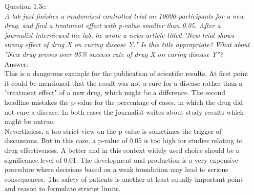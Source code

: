 
Question 1.3c:\\	
\textsl{A lab just finishes a randomized controlled trial on 10000 participants for a new drug, and find a treatment effect with p-value smaller than 0.05. After a journalist interviewed the lab, he wrote a news article titled "New trial shows strong effect of drug X on curing disease Y." Is this title appropriate? What about "New drug proves over 95\% success rate of drug X on curing disease Y"?}\\

Answer:\\
This is a dangerous example for the publication of scientific results. At first point it could be mentioned that the result was not a cure for a disease rather than a "treatment effect" of a new drug, which might be a difference. The second headline mistakes the p-value for the percentage of cases, in which the drug did not cure a disease. In both cases the journalist writes about study results which might be untrue.\\

Nevertheless, a too strict view on the p-value is sometimes the trigger of discussions. But in this case, a p-value of 0.05 is too high for studies relating to drug effectiveness. A better and in this context widely used choice should be a significance level of 0.01. The development and production is a very expensive procedure where decisions based on a weak foundation may lead to serious consequences. The safety of patients is another at least equally important point and reason to formulate stricter limits.\\


